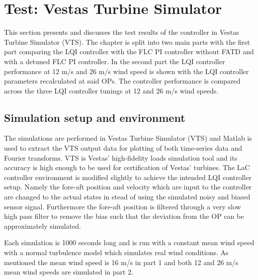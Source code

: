 \section{Test: Vestas Turbine Simulator} \label{sec:test_vts}
This section presents and discusses the test results of the controller in Vestas Turbine Simulator (VTS). The chapter is split into two main parts with the first part comparing the LQI controller with the FLC PI controller without FATD and with a detuned FLC PI controller. In the second part the LQI controller performance at 12 m/s and 26 m/s wind speed is shown with the LQI controller parameters recalculated at said OPs. The controller performance is compared across the three LQI controller tunings at 12 and 26 m/s wind speeds.

\subsection{Simulation setup and environment}
The simulations are performed in Vestas Turbine Simulator (VTS) and Matlab is used to extract the VTS output data for plotting of both time-series data and Fourier transforms. VTS is Vestas' high-fidelity loads simulation tool and its accuracy is high enough to be used for certification of Vestas' turbines.  The LaC controller environment is modified slightly to achieve the intended LQI controller setup. Namely the fore-aft position and velocity which are input to the controller are changed to the actual states in stead of using the simulated noisy and biased sensor signal. Furthermore the fore-aft position is filtered through a very slow high pass filter to remove the bias such that the deviation from the OP can be approximately simulated.

\smallskip
Each simulation is 1000 seconds long and is run with a constant mean wind speed with a normal turbulence model which simulates real wind conditions. As mentioned the mean wind speed is 16 m/s in part 1 and both 12 and 26 m/s mean wind speeds are simulated in part 2.

